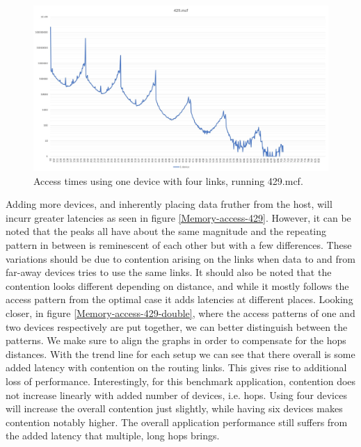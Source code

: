 \begin{figure}[!ht]
    \centering
    \includegraphics[width=1.0\linewidth]{figure/429-x_4-1.jpg}
    \caption{Access times using one device with four links, running 429.mcf.}
    \label{Memory-access-429-single}
\end{figure}

Adding more devices, and inherently placing data fruther from the host, will incurr greater latencies as seen in figure \ref{Memory-access-429}. However, it can be noted that the peaks all have about the same magnitude and the repeating pattern in between is reminescent of each other but with a few differences. These variations should be due to contention arising on the links when data to and from far-away devices tries to use the same links. It should also be noted that the contention looks different depending on distance, and while it mostly follows the access pattern from the optimal case it adds latencies at different places. Looking closer, in figure \ref{Memory-access-429-double}, where the access patterns of one and two devices respectively are put together, we can better distinguish between the patterns. We make sure to align the graphs in order to compensate for the hops distances. With the trend line for each setup we can see that there overall is some added latency with contention on the routing links. This gives rise to additional loss of performance. Interestingly, for this benchmark application, contention does not increase linearly with added number of devices, i.e. hops. Using four devices will increase the overall contention just slightly, while having six devices makes contention notably higher. The overall application performance still suffers from the added latency that multiple, long hops brings.

